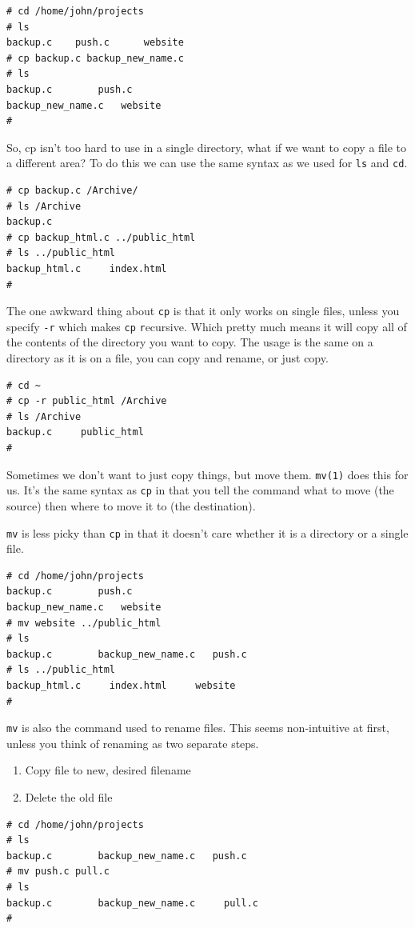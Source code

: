 {\tt \begin{verbatim}
# cd /home/john/projects
# ls
backup.c	push.c		website
# cp backup.c backup_new_name.c
# ls
backup.c		push.c
backup_new_name.c	website
#
\end{verbatim}
}

So, cp isn't too hard to use in a single directory, what if we want to copy a file to a
different area? To do this we can use the same syntax as we used for {\tt ls} and {\tt cd}.
{\tt \begin{verbatim}
# cp backup.c /Archive/
# ls /Archive
backup.c
# cp backup_html.c ../public_html
# ls ../public_html
backup_html.c     index.html
#
\end{verbatim}
}

The one awkward thing about {\tt cp} is that it only works on single files,
unless you specify {\tt -r} which makes {\tt cp} {\tt r}ecursive.  Which
pretty much means it will copy all of the contents of the directory you
want to copy. The usage is the same on a directory as it is on a file,
you can copy and rename, or just copy.
{\tt \begin{verbatim}
# cd ~
# cp -r public_html /Archive
# ls /Archive
backup.c     public_html
#
\end{verbatim}
}

Sometimes we don't want to just copy things, but move them. {\tt mv(1)}
does this for us.  It's the same syntax as {\tt cp} in that you tell the
command what to move (the source) then where to move it to (the destination).

{\tt mv} is less picky than {\tt cp} in that it doesn't care whether it is a 
directory or a single file.

{\tt \begin{verbatim}
# cd /home/john/projects
backup.c		push.c
backup_new_name.c	website
# mv website ../public_html
# ls
backup.c		backup_new_name.c	push.c
# ls ../public_html
backup_html.c     index.html     website
#
\end{verbatim}
}

{\tt mv} is also the command used to rename files. 
This seems non-intuitive at first, unless you think of
renaming as two separate steps. 
\begin{enumerate}
\item Copy file to new, desired filename
\item Delete the old file
\end{enumerate}

{\tt \begin{verbatim}
# cd /home/john/projects
# ls 
backup.c		backup_new_name.c	push.c
# mv push.c pull.c
# ls
backup.c		backup_new_name.c     pull.c
#
\end{verbatim}
}

